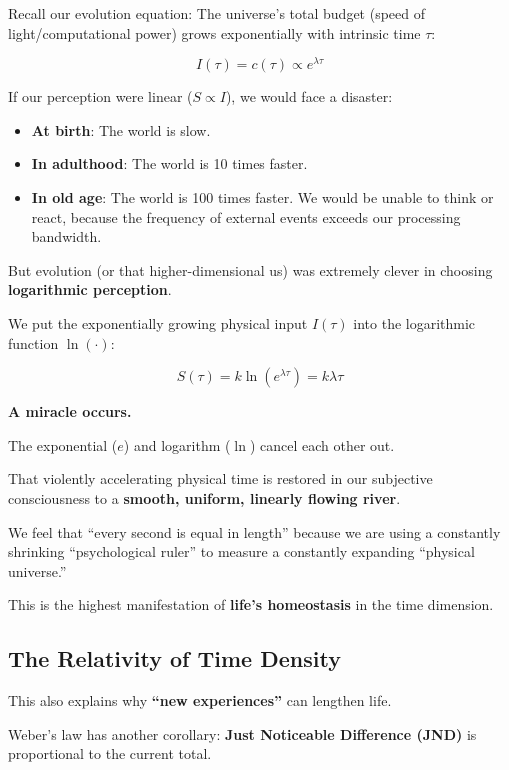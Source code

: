 Recall our evolution equation: The universe's total budget (speed of light/computational power) grows exponentially with intrinsic time $\tau$:

\[I(\tau) = c(\tau) \propto e^{\lambda \tau}\]

If our perception were linear ($S \propto I$), we would face a disaster:

\begin{itemize}
\item \textbf{At birth}: The world is slow.

\item \textbf{In adulthood}: The world is 10 times faster.

\item \textbf{In old age}: The world is 100 times faster. We would be unable to think or react, because the frequency of external events exceeds our processing bandwidth.
\end{itemize}

But evolution (or that higher-dimensional us) was extremely clever in choosing \textbf{logarithmic perception}.

We put the exponentially growing physical input $I(\tau)$ into the logarithmic function $\ln(\cdot)$:

\[S(\tau) = k \ln(e^{\lambda \tau}) = k \lambda \tau\]

\textbf{A miracle occurs.}

The exponential ($e$) and logarithm ($\ln$) cancel each other out.

That violently accelerating physical time is restored in our subjective consciousness to a \textbf{smooth, uniform, linearly flowing river}.

We feel that ``every second is equal in length'' because we are using a constantly shrinking ``psychological ruler'' to measure a constantly expanding ``physical universe.''

This is the highest manifestation of \textbf{life's homeostasis} in the time dimension.

\subsection{The Relativity of Time Density}

This also explains why \textbf{``new experiences''} can lengthen life.

Weber's law has another corollary: \textbf{Just Noticeable Difference (JND)} is proportional to the current total.

